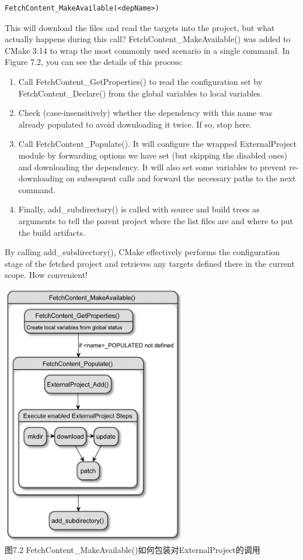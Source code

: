 \begin{lstlisting}[style=styleCMake]
FetchContent_MakeAvailable(<depName>)
\end{lstlisting} 

This will download the files and read the targets into the project, but what actually happens during this call? FetchContent\_MakeAvailable() was added to CMake 3.14 to wrap the most commonly used scenario in a single command. In Figure 7.2, you can see the details of this process:

\begin{enumerate}
\item 
Call FetchContent\_GetProperties() to read the configuration set by FetchContent\_Declare() from the global variables to local variables.

\item 
Check (case-insensitively) whether the dependency with this name was already populated to avoid downloading it twice. If so, stop here.

\item 
Call FetchContent\_Populate(). It will configure the wrapped ExternalProject module by forwarding options we have set (but skipping the disabled ones) and downloading the dependency. It will also set some variables to prevent re-downloading on subsequent calls and forward the necessary paths to the next command.

\item 
Finally, add\_subdirectory() is called with source and build trees as arguments to tell the parent project where the list files are and where to put the build artifacts.
\end{enumerate}

By calling add\_subdirectory(), CMake effectively performs the configuration stage of the fetched project and retrieves any targets defined there in the current scope. How convenient!

\begin{center}
\includegraphics[width=0.6\textwidth]{content/2/chapter7/images/2.jpg}\\
图7.2  FetchContent\_MakeAvailable()如何包装对ExternalProject的调用
\end{center}

